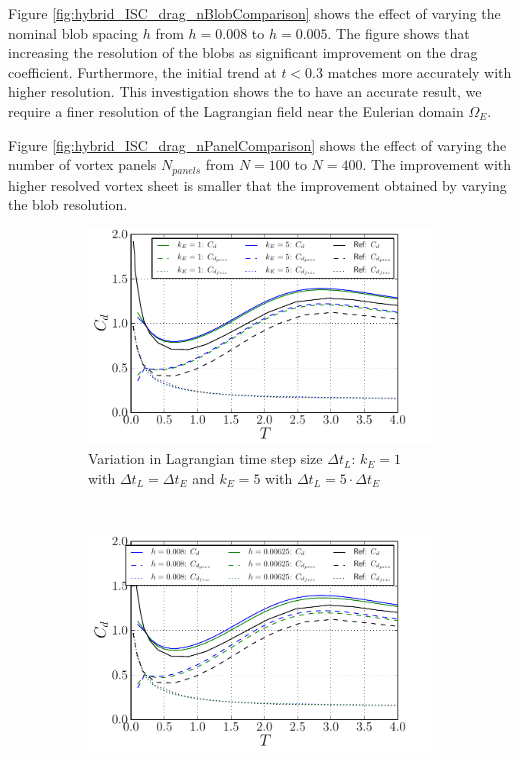 Figure \ref{fig:hybrid_ISC_drag_nBlobComparison} shows the effect of varying the nominal blob spacing $h$ from $h=0.008$ to $h=0.005$. The figure shows that increasing the resolution of the blobs as significant improvement on the drag coefficient. Furthermore, the initial trend at $t<0.3$ matches more accurately with higher resolution. This investigation shows the to have an accurate result, we require a finer resolution of the Lagrangian field near the Eulerian domain $\Omega_E$.

Figure \ref{fig:hybrid_ISC_drag_nPanelComparison} shows the effect of varying the number of vortex panels $N_{panels}$ from $N=100$ to $N=400$. The improvement with higher resolved vortex sheet is smaller that the improvement obtained by varying the blob resolution.

	\begin{figure}[!p]
     \centering
     \begin{subfigure}[t]{0.49\textwidth}
             \includegraphics[width=\textwidth]{./figures/hybrid/isc/hybrid_ISC_drag_kComparison.pdf}
             \caption{Variation in Lagrangian time step size $\Delta t_L$: $k_E=1$ with $\Delta t_L = \Delta t_E$ and $k_E=5$ with $\Delta t_L = 5\cdot{\Delta t_E}$}
             \label{fig:hybrid_ISC_drag_kComparison}
     \end{subfigure}%
     ~ %
     \begin{subfigure}[t]{0.49\textwidth}
             \includegraphics[width=\textwidth]{./figures/hybrid/isc/hybrid_ISC_drag_nBlobComparison.pdf}

\end{subfigure}
\end{figure}
